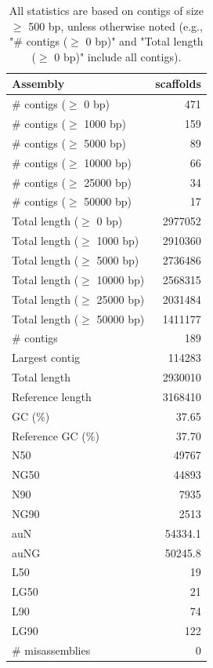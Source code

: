 \documentclass[12pt,a4paper]{article}
\begin{document}
\begin{table}[ht]
\begin{center}
\caption{All statistics are based on contigs of size $\geq$ 500 bp, unless otherwise noted (e.g., "\# contigs ($\geq$ 0 bp)" and "Total length ($\geq$ 0 bp)" include all contigs).}
\begin{tabular}{|l*{1}{|r}|}
\hline
Assembly & scaffolds \\ \hline
\# contigs ($\geq$ 0 bp) & 471 \\ \hline
\# contigs ($\geq$ 1000 bp) & 159 \\ \hline
\# contigs ($\geq$ 5000 bp) & 89 \\ \hline
\# contigs ($\geq$ 10000 bp) & 66 \\ \hline
\# contigs ($\geq$ 25000 bp) & 34 \\ \hline
\# contigs ($\geq$ 50000 bp) & 17 \\ \hline
Total length ($\geq$ 0 bp) & 2977052 \\ \hline
Total length ($\geq$ 1000 bp) & 2910360 \\ \hline
Total length ($\geq$ 5000 bp) & 2736486 \\ \hline
Total length ($\geq$ 10000 bp) & 2568315 \\ \hline
Total length ($\geq$ 25000 bp) & 2031484 \\ \hline
Total length ($\geq$ 50000 bp) & 1411177 \\ \hline
\# contigs & 189 \\ \hline
Largest contig & 114283 \\ \hline
Total length & 2930010 \\ \hline
Reference length & 3168410 \\ \hline
GC (\%) & 37.65 \\ \hline
Reference GC (\%) & 37.70 \\ \hline
N50 & 49767 \\ \hline
NG50 & 44893 \\ \hline
N90 & 7935 \\ \hline
NG90 & 2513 \\ \hline
auN & 54334.1 \\ \hline
auNG & 50245.8 \\ \hline
L50 & 19 \\ \hline
LG50 & 21 \\ \hline
L90 & 74 \\ \hline
LG90 & 122 \\ \hline
\# misassemblies & 0 \\ \hline

\end{tabular}
\end{center}
\end{table}
\end{document}
